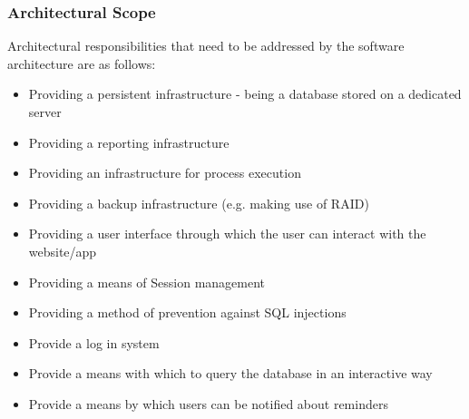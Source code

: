 \documentclass[a4paper]{article}
\begin{document}
    \subsubsection{Architectural Scope}
        Architectural responsibilities that need to be addressed by the software architecture are as follows:
        \begin{itemize}
            \item Providing a persistent infrastructure - being a database stored on a dedicated server
            \item Providing a reporting infrastructure
            \item Providing an infrastructure for process execution
            \item Providing a backup infrastructure (e.g. making use of RAID)
            \item Providing a user interface through which the user can interact with the website/app
            \item Providing a means of Session management
            \item Providing a method of prevention against SQL injections
            \item Provide a log in system
            \item Provide a means with which to query the database in an interactive way
            \item Provide a means by which users can be notified about reminders
        \end{itemize}
\end{document}
